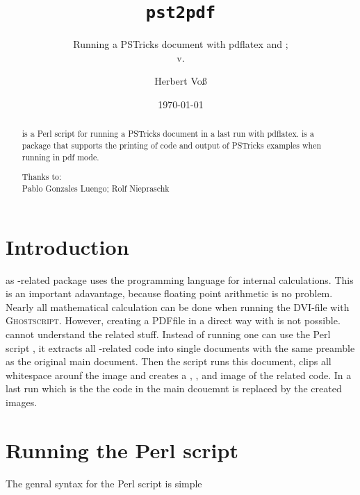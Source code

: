 \documentclass[11pt,english,BCOR10mm,DIV12,bibliography=totoc,parskip=false,
   smallheadings, headexclude,footexclude,oneside]{pst-doc}
\let\pstFV\fileversion
\def\DVI{\textsc{DVI}}
\def\PDF{\textsc{PDF}}
\def\gs{\textsc{Ghostscript}}
\begin{document}
\title{\texttt{pst2pdf}}
\subtitle{Running a PSTricks document with pdflatex and ;\\
\small v.\pstFV}
\author{Herbert Vo\ss}
\docauthor{}
\date{\today}
\maketitle

\tableofcontents

\clearpage

\begin{abstract}
\noindent
{} is a Perl script for running a PSTricks document in a last run
with pdflatex.  is a package that supports the printing of
code and output of PSTricks examples when running in pdf mode.

\vfill\noindent
Thanks to: \\
Pablo Gonzales Luengo;
Rolf Niepraschk

\end{abstract}


\section{Introduction}
\PST as \PS-related package uses the programming language \PS for internal
calculations. This is an important adavantage, because floating point arithmetic is no
problem. Nearly all mathematical calculation can be done when running the \DVI-file
with \gs. However, creating a \PDF file in a direct way with  is
not possible.  cannot understand the \PS related stuff. Instead
of running  one can use the Perl script , it extracts
all \PST-related code into single documents with the same preamble as the original
main document. Then the script runs this document, clips all whitespace arounf the
image and creates a , , and  image of the \PST 
related code. In a last run which is the  the \PST code in the
main dcouemnt is replaced by the created images.

\section{Running the Perl script}
The genral syntax for the Perl script is simple

\begin{BDef}
  
\end{BDef}
\end{document}
